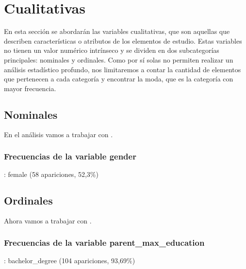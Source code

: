 \section{Cualitativas}
En esta sección se abordarán las variables cualitativas, que son aquellas que describen
características o atributos de los elementos de estudio. Estas variables no tienen
un valor numérico intrínseco y se dividen en dos subcategorías principales: nominales y ordinales.
Como por sí solas no permiten realizar un análisis estadístico profundo, nos limitaremos a contar la
cantidad de elementos que pertenecen a cada categoría y encontrar la moda, que es la categoría con
mayor frecuencia.

\subsection{Nominales}
En el análisis vamos a trabajar con .

\subsubsection{Frecuencias de la variable gender}


\AnalisisDescriptivo
{}: female (58 apariciones, 52,3\%) 




\subsection{Ordinales}
Ahora vamos a trabajar con .

\subsubsection{Frecuencias de la variable parent\_max\_education}


\AnalisisDescriptivo
{}: bachelor\_degree (104 apariciones, 93,69\%)


